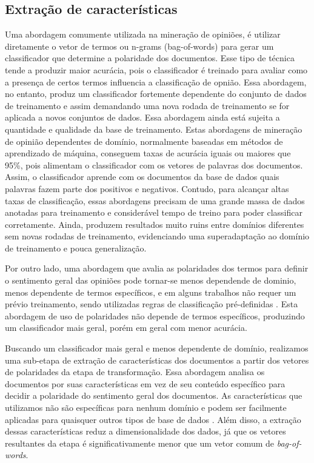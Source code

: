 \documentclass[template.tex]{subfiles}
\begin{document}
\subsection{Extração de características}

Uma abordagem comumente utilizada na mineração de opiniões, é utilizar diretamente o vetor de termos ou n-grams (bag-of-words) para gerar um classificador que determine a polaridade dos documentos. Esse tipo de técnica tende a produzir maior acurácia, pois o classificador é treinado para avaliar como a presença de certos termos influencia a classificação de opnião. Essa abordagem, no entanto, produz um classificador fortemente dependente do conjunto de dados de treinamento e assim demandando uma nova rodada de treinamento se for aplicada a novos conjuntos de dados. Essa abordagem ainda está sujeita a quantidade e qualidade da base de treinamento. Estas abordagens de mineração de opinião dependentes de domínio, normalmente baseadas em métodos de aprendizado de máquina, conseguem taxas de acurácia iguais ou maiores que 95\%, pois alimentam o classificador com os vetores de palavras dos documentos. Assim, o classificador aprende com os documentos da base de dados quais palavras fazem parte dos positivos e negativos. Contudo, para alcançar altas taxas de classificação, essas abordagens precisam de uma grande massa de dados anotadas para treinamento e considerável tempo de treino para poder classificar corretamente. Ainda, produzem resultados muito ruins entre domínios diferentes sem novas rodadas de treinamento, evidenciando uma superadaptação ao domínio de treinamento e pouca generalização.


Por outro lado, uma abordagem que avalia as polaridades dos termos para definir o sentimento geral das opiniões pode tornar-se menos dependende de dominio, menos dependente de termos específicos,  e em alguns trabalhos não requer um prévio treinamento, sendo utilizadas regras de classificação pré-definidas \cite{nadali2010sentiment, pimpalkar2013sentimental}. Esta abordagem de uso de polaridades não depende de termos específicos, produzindo um classificador mais geral, porém em geral com menor acurácia. 


Buscando um classificador mais geral e menos dependente de domínio, realizamos uma sub-etapa de extração de características dos documentos a partir dos vetores de polaridades da etapa de transformação. Essa abordagem analisa os documentos por suas características em vez de seu conteúdo específico para decidir a polaridade do sentimento geral dos documentos. As características que utilizamos não são específicas para nenhum domínio e podem ser facilmente aplicadas para quaisquer outros tipos de base de dados \cite{pang2002thumbs}. Além disso, a extração dessas características reduz a dimensionalidade dos dados, já que os vetores resultantes da etapa é significativamente menor que um vetor comum de \textit{bag-of-words}.
\end{document}
